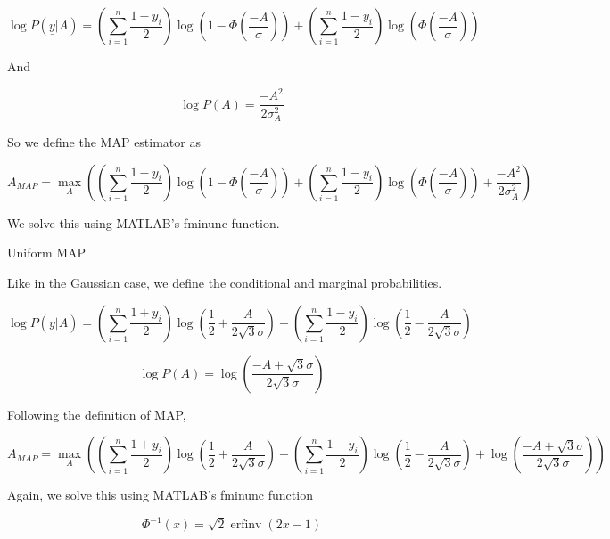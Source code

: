 \documentclass{amsart}
\DeclareMathOperator\erfinv{erfinv}
\begin{document}
\begin{equation}
\log P(\underline{y}|A) = \left( \sum_{i=1}^{n}\frac{1-y_i}{2} \right) \log(1-\Phi(\frac{-A}{\sigma})) + \left( \sum_{i=1}^{n}\frac{1-y_i}{2} \right)  \log(\Phi(\frac{-A}{\sigma}))
\end{equation}

And

\begin{equation}
\log P(A) = \frac{-A^2}{2\sigma_{A}^2}
\end{equation}

So we define the MAP estimator as

\begin{equation}
A_{MAP} = \max_{A}\left( \left( \sum_{i=1}^{n}\frac{1-y_i}{2} \right) \log(1-\Phi(\frac{-A}{\sigma})) + \left( \sum_{i=1}^{n}\frac{1-y_i}{2} \right)  \log(\Phi(\frac{-A}{\sigma})) + \frac{-A^2}{2\sigma_{A}^2} \right)
\end{equation}

We solve this using MATLAB's fminunc function.

\newpage

Uniform MAP

Like in the Gaussian case, we define the conditional and marginal probabilities.

\begin{equation}
\log P(\underline{y}|A) = \left(\sum_{i=1}^{n}\frac{1+y_i}{2}\right)\log\left( \frac{1}{2} + \frac{A}{2\sqrt{3}\sigma} \right) + \left(\sum_{i=1}^{n}\frac{1-y_i}{2}\right)\log\left( \frac{1}{2} - \frac{A}{2\sqrt{3}\sigma} \right)
\end{equation}

\begin{equation}
\log P(A) = \log(\frac{-A + \sqrt{3}\sigma}{2\sqrt{3}\sigma})
\end{equation}

Following the definition of MAP,

\begin{equation}
A_{MAP} = \max_{A} \left( \left(\sum_{i=1}^{n}\frac{1+y_i}{2}\right)\log\left( \frac{1}{2} + \frac{A}{2\sqrt{3}\sigma} \right) + \left(\sum_{i=1}^{n}\frac{1-y_i}{2}\right)\log\left( \frac{1}{2} - \frac{A}{2\sqrt{3}\sigma} \right) + \log(\frac{-A + \sqrt{3}\sigma}{2\sqrt{3}\sigma}) \right)
\end{equation}

Again, we solve this using MATLAB's fminunc function

\begin{equation}
\Phi^{-1}(x) = \sqrt{2}\erfinv(2x-1)
\end{equation}
\end{document}
